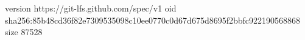 version https://git-lfs.github.com/spec/v1
oid sha256:85b48cd36f82e7309535098c10ee0770c0d67d675d8695f2bbfc922190568868
size 87528
